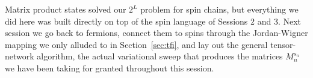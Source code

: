 \documentclass[all_sessions.tex]{subfiles}
\begin{document}
Matrix product states solved our $2^L$ problem for spin chains, but everything we did here was
built directly on top of the spin language of Sessions 2 and 3. Next session we go back to
fermions, connect them to spins through the Jordan-Wigner mapping we only alluded to in
Section~\ref{sec:tfi}, and lay out the general tensor-network algorithm, the actual
variational sweep that produces the matrices $M_n^{s_n}$ we have been taking for granted throughout
this session.
\end{document}

